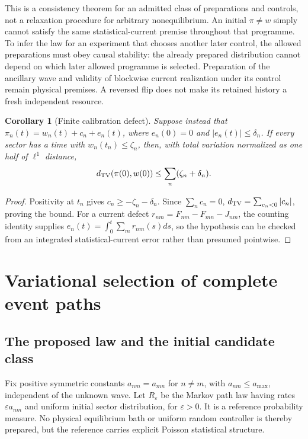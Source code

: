 \documentclass[11pt,oneside,openany]{book}
\newtheorem{corollary}[theorem]{Corollary}
\theoremstyle{definition}
\theoremstyle{remark}\newtheorem{remark}[theorem]{Remark}
\begin{document}
This is a consistency theorem for an admitted class of preparations and
controls, not a relaxation procedure for arbitrary nonequilibrium. An
initial $\pi\ne w$ simply cannot satisfy the same statistical-current
premise throughout that programme. To infer the law for an experiment that
chooses another later control, the allowed preparations must obey causal
stability: the already prepared distribution cannot depend on which later
allowed programme is selected. Preparation of the ancillary wave and
validity of blockwise current realization under its control remain physical
premises. A reversed flip does not make its retained history a fresh
independent resource.

\begin{corollary}[Finite calibration defect]\label{stat:calibration-defect}
Suppose instead that
$\pi_n(t)=w_n(t)+c_n+e_n(t)$, where $e_n(0)=0$ and
$|e_n(t)|\leq\delta_n$. If every sector has a time with
$w_n(t_n)\leq\zeta_n$, then, with total variation normalized as one half of
$\ell^1$ distance,
\begin{equation}\label{stat:calibration-bound}
 d_{\rm TV}(\pi(0),w(0))\leq\sum_n(\zeta_n+\delta_n).
\end{equation}
\end{corollary}
\begin{proof}
Positivity at $t_n$ gives $c_n\geq-\zeta_n-\delta_n$. Since $\sum_n c_n=0$,
$d_{\rm TV}=\sum_{c_n<0}|c_n|$, proving the bound. For a current defect
$r_{nm}=F_{nm}-F_{mn}-J_{nm}$, the counting identity supplies
$e_n(t)=\int_0^t\sum_m r_{nm}(s)ds$, so the hypothesis can be checked from an
integrated statistical-current error rather than presumed pointwise.
\end{proof}

\chapter{Variational selection of complete event paths}
\label{stat:entropy-chapter}

\section{The proposed law and the initial candidate class}

Fix positive symmetric constants $a_{nm}=a_{mn}$ for $n\ne m$, with
$a_{nm}\leq a_{\max}$, independent of the unknown wave. Let
$R_\varepsilon$ be the Markov path law having rates $\varepsilon a_{nm}$ and
uniform initial sector distribution, for $\varepsilon>0$. It is a reference
probability measure. No physical equilibrium bath or uniform random
controller is thereby prepared, but the reference carries explicit Poisson
statistical structure.
\end{document}
